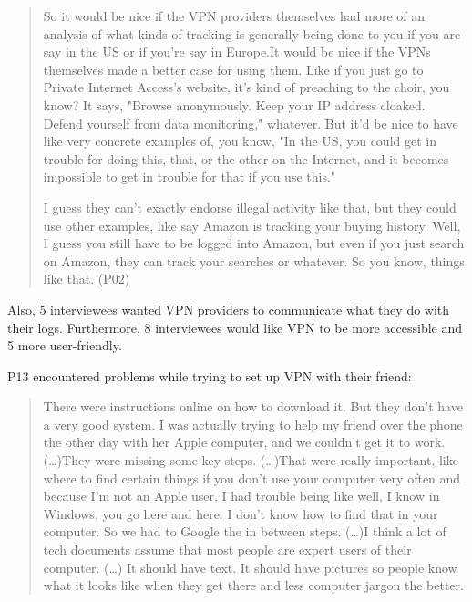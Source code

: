 \begin{quote}So it would be nice if the VPN providers themselves had more of an analysis of what kinds of tracking is generally being done to you if you are say in the US or if you're say in Europe.It would be nice if the VPNs themselves made a better case for using them. Like if you just go to Private Internet Access's website, it's kind of preaching to the choir, you know? It says, "Browse anonymously. Keep your IP address cloaked. Defend yourself from data monitoring," whatever. But it'd be nice to have like very concrete examples of, you know, "In the US, you could get in trouble for doing this, that, or the other on the Internet, and it becomes impossible to get in trouble for that if you use this."

I guess they can't exactly endorse illegal activity like that, but they could use other examples, like say Amazon is tracking your buying history. Well, I guess you still have to be logged into Amazon, but even if you just search on Amazon, they can track your searches or whatever. So you know, things like that. (P02)\end{quote}


Also, 5 interviewees wanted VPN providers to communicate what they do with their logs. Furthermore, 8 interviewees would like VPN to be more accessible and 5 more user-friendly. 

P13 encountered problems while trying to set up VPN with their friend:
\begin{quote}There were instructions online on how to download it. But they don't have a very good system. I was actually trying to help my friend over the phone the other day with her Apple computer, and we couldn't get it to work. (\dots)They were missing some key steps. (\dots)That were really important, like where to find certain things if you don't use your computer very often and because I'm not an Apple user, I had trouble being like well, I know in Windows, you go here and here. I don't know how to find that in your computer. So we had to Google the in between steps. (\dots)I think a lot of tech documents assume that most people are expert users of their computer. (\dots) It should have text. It should have pictures so people know what it looks like when they get there and less computer jargon the better.\end{quote}

